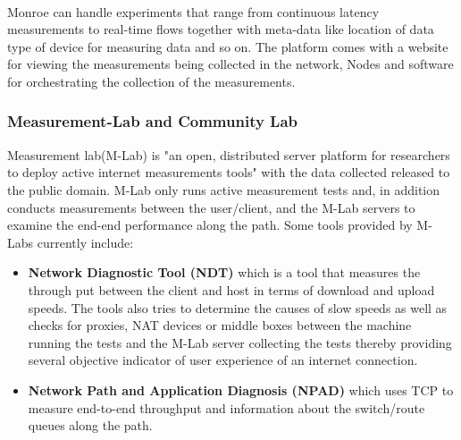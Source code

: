 \paragraph{}
Monroe can handle experiments that range from continuous latency measurements to real-time flows together with meta-data like location of data type of device for measuring data and so on\cite{7523537}.
The platform comes with a website for viewing the measurements being collected in the network, Nodes and software for orchestrating the collection of the measurements\cite{7523537}.
\subsubsection{Measurement-Lab and Community Lab}
Measurement lab(M-Lab) is "an open, distributed server platform for researchers to deploy active internet measurements tools" \cite{Dovrolis:2010:MLO:1823844.1823853,Braem:2015:AEQ:2830629.2830639} with the data collected released to the public domain\cite{Dovrolis:2010:MLO:1823844.1823853,Braem:2015:AEQ:2830629.2830639}.
M-Lab only runs active measurement tests and, in addition conducts measurements between the user/client, and the M-Lab servers to examine the end-end performance along the path\cite{Dovrolis:2010:MLO:1823844.1823853}.
Some tools provided by M-Labs currently include:
\begin{itemize}
    \item \textbf{Network Diagnostic Tool (NDT)} which is a tool that measures the through put between the client and host in terms of download and upload speeds\cite{Dovrolis:2010:MLO:1823844.1823853,Braem:2015:AEQ:2830629.2830639}.
    The tools also tries to determine the causes of slow speeds as well as checks for proxies, NAT devices or middle boxes between the machine running the tests and the M-Lab server collecting the tests thereby providing several objective indicator of user experience of an internet connection\cite{Braem:2015:AEQ:2830629.2830639}.
    \item \textbf{Network Path and Application Diagnosis (NPAD)} which uses TCP to measure end-to-end throughput and information about the switch/route queues along the path\cite{Dovrolis:2010:MLO:1823844.1823853}.
\end{itemize}

